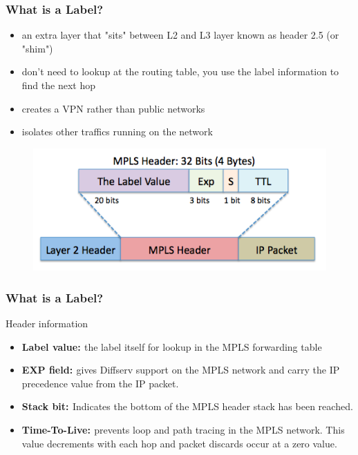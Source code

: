 \documentclass[12pt]{beamer}
\begin{document}
\begin{frame}
	\frametitle{What is a Label?}
		
	\begin{itemize}
		\item an extra layer that "sits" between L2 and L3 layer
		known as header 2.5 (or "shim")
		\item don't need to lookup at the routing table, you use the label information
		to find the next hop
		\item creates a VPN rather than public networks
		\item isolates other traffics running on the network

	\end{itemize}

		\begin{figure}[h]
			\begin{center}
				\includegraphics[scale=0.40]{header_mpls.png}
			\end{center}
		\end{figure}	
	
	
\end{frame}

\begin{frame}
	\frametitle{What is a Label?}
	Header information
	\begin{itemize}
		\item {\bf{Label value: }}the label itself for lookup in the MPLS forwarding table
		\item {\bf{EXP field: }}gives Diffserv support on the MPLS network and carry the IP precedence value from the IP packet.
		\item {\bf{Stack bit: }}Indicates the bottom of the MPLS header stack has been reached.
		\item {\bf{Time-To-Live: }}prevents loop and path tracing in the MPLS network. This value decrements with each hop and packet discards occur at a zero value.
	\end{itemize}		
	
\end{frame}
\end{document}
